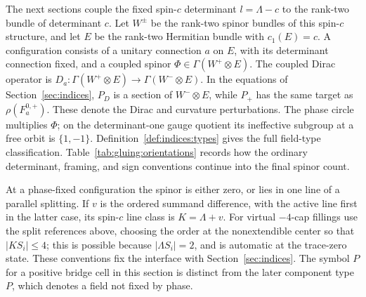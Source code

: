 The next sections couple the fixed spin-\(c\) determinant
\(l=\Lambda-c\) to the rank-two bundle of determinant \(c\).
Let $W^\pm$ be the rank-two spinor bundles of this spin-$c$ structure,
and let $E$ be the rank-two Hermitian bundle with $c_1(E)=c$.
A configuration consists of a unitary connection $a$ on $E$, with
its determinant connection fixed, and a coupled spinor
$\Phi\in\Gamma(W^+\otimes E)$.  The coupled Dirac operator is
$D_a:\Gamma(W^+\otimes E)\longrightarrow\Gamma(W^-\otimes E)$.
In the equations of Section~\ref{sec:indices}, $P_D$ is a section of
$W^-\otimes E$, while $P_+$ has the same target as
$\rho(F_a^{0,+})$.  These denote the Dirac and curvature perturbations.
The phase circle multiplies $\Phi$; on the determinant-one gauge
quotient its ineffective subgroup at a free orbit is $\{1,-1\}$.
Definition~\ref{def:indices:types} gives the full field-type
classification.  Table~\ref{tab:gluing:orientations} records how the
ordinary determinant, framing, and sign conventions continue into
the final spinor count.

At a phase-fixed configuration the spinor is either zero, or lies
in one line of a parallel splitting.  If \(v\) is the ordered
summand difference, with the active line first in the latter case,
its spin-\(c\) line class is \(K=\Lambda+v\).  For virtual
\(-4\)-cap fillings use the split references above, choosing the
order at the nonextendible center so that \(|K S_i|\le4\);
this is possible because \(|\Lambda S_i|=2\), and is automatic
at the trace-zero state.  These conventions fix the interface with
Section~\ref{sec:indices}.  The symbol \(P\) for a positive bridge
cell in this section is distinct from the later component type
\(P\), which denotes a field not fixed by phase.
